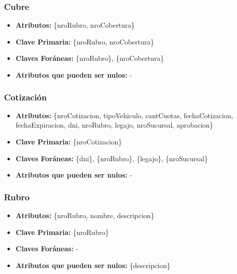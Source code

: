 \documentclass[a4paper,11pt]{article}
\begin{document}
\subsubsection{Cubre}

\begin{itemize}

	\item \textbf{Atributos:} \{nroRubro, nroCobertura\}

	\item \textbf{Clave Primaria:} \{nroRubro, nroCobertura\}
	
	\item \textbf{Claves Foráneas:} \{nroRubro\}, \{nroCobertura\}

	\item \textbf{Atributos que pueden ser nulos:} -
	
\end{itemize}


\subsubsection{Cotización}

\begin{itemize}

	\item \textbf{Atributos:} \{nroCotizacion, tipoVehiculo, cantCuotas, fechaCotizacion, fechaExpiracion, dni, nroRubro, legajo, nroSucursal, aprobacion\}
	
	\item \textbf{Clave Primaria:} \{nroCotizacion\}
	
	\item \textbf{Claves Foráneas:} \{dni\}, \{nroRubro\}, \{legajo\}, \{nroSucursal\}

	\item \textbf{Atributos que pueden ser nulos:} -
	
\end{itemize}

\subsubsection{Rubro}

\begin{itemize}

	\item \textbf{Atributos:} \{nroRubro, nombre, descripcion\}
	
	\item \textbf{Clave Primaria:} \{nroRubro\}
	
	\item \textbf{Claves Foráneas:} -

	\item \textbf{Atributos que pueden ser nulos:} \{descripcion\}
	
\end{itemize}
\end{document}
